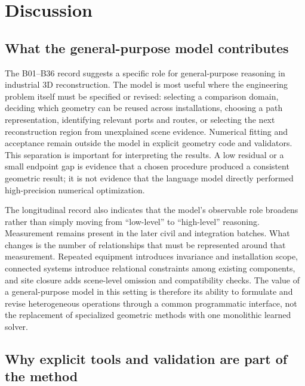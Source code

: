 \documentclass[10pt,a4paper]{article}
\begin{document}
\hypertarget{discussion}{%
\section{Discussion}\label{discussion}}

\hypertarget{what-the-general-purpose-model-contributes}{%
\subsection{What the general-purpose model
contributes}\label{what-the-general-purpose-model-contributes}}

The B01--B36 record suggests a specific role for general-purpose
reasoning in industrial 3D reconstruction. The model is most useful
where the engineering problem itself must be specified or revised:
selecting a comparison domain, deciding which geometry can be reused
across installations, choosing a path representation, identifying
relevant ports and routes, or selecting the next reconstruction region
from unexplained scene evidence. Numerical fitting and acceptance remain
outside the model in explicit geometry code and validators. This
separation is important for interpreting the results. A low residual or
a small endpoint gap is evidence that a chosen procedure produced a
consistent geometric result; it is not evidence that the language model
directly performed high-precision numerical optimization.

The longitudinal record also indicates that the model's observable role
broadens rather than simply moving from ``low-level'' to ``high-level''
reasoning. Measurement remains present in the later civil and
integration batches. What changes is the number of relationships that
must be represented around that measurement. Repeated equipment
introduces invariance and installation scope, connected systems
introduce relational constraints among existing components, and site
closure adds scene-level omission and compatibility checks. The value of
a general-purpose model in this setting is therefore its ability to
formulate and revise heterogeneous operations through a common
programmatic interface, not the replacement of specialized geometric
methods with one monolithic learned solver.

\hypertarget{why-explicit-tools-and-validation-are-part-of-the-method}{%
\subsection{Why explicit tools and validation are part of the
method}\label{why-explicit-tools-and-validation-are-part-of-the-method}}
\end{document}
